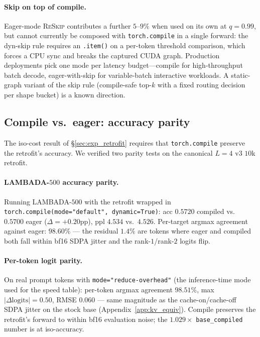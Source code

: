 \documentclass{article}
\newcommand{\reskip}{\textsc{ReSkip}}
\begin{document}
\paragraph{Skip on top of compile.} Eager-mode \reskip{} contributes a further $5$--$9\%$ when used on its own at $q{=}0.99$, but cannot currently be composed with \texttt{torch.compile} in a single forward: the dyn-skip rule requires an \texttt{.item()} on a per-token threshold comparison, which forces a CPU sync and breaks the captured CUDA graph. Production deployments pick one mode per latency budget---compile for high-throughput batch decode, eager-with-skip for variable-batch interactive workloads. A static-graph variant of the skip rule (compile-safe top-$k$ with a fixed routing decision per shape bucket) is a known direction.

\subsection{Compile vs.\ eager: accuracy parity}
\label{app:compile_accuracy}

The iso-cost result of \S\ref{sec:exp_retrofit} requires that \texttt{torch.compile} preserve the retrofit's accuracy. We verified two parity tests on the canonical $L{=}4$ v3 $10$k retrofit.

\paragraph{LAMBADA-$500$ accuracy parity.} Running LAMBADA-$500$ with the retrofit wrapped in \texttt{torch.compile(mode="default", dynamic=True)}: acc $0.5720$ compiled vs.\ $0.5700$ eager ($\Delta{=}+0.20$pp), ppl $4.534$ vs.\ $4.526$. Per-target argmax agreement against eager: $98.60\%$ — the residual $1.4\%$ are tokens where eager and compiled both fall within bf16 SDPA jitter and the rank-$1$/rank-$2$ logits flip.

\paragraph{Per-token logit parity.} On real prompt tokens with \texttt{mode="reduce-overhead"} (the inference-time mode used for the speed table): per-token argmax agreement $98.51\%$, max $|\Delta\text{logits}|=0.50$, RMSE $0.060$ — same magnitude as the cache-on/cache-off SDPA jitter on the stock base (Appendix~\ref{app:kv_equiv}). Compile preserves the retrofit's forward to within bf16 evaluation noise; the $1.029\times$ \texttt{base\_compiled} number is at iso-accuracy.
\end{document}
